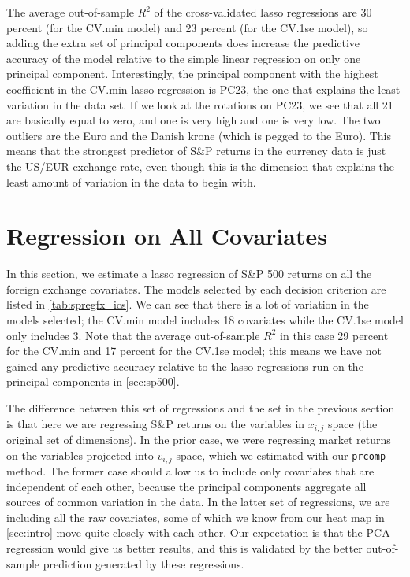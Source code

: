 \documentclass[11pt, fleqn]{article}
\begin{document}


The average out-of-sample $R^2$ of the cross-validated lasso regressions are 30 percent (for the CV.min model) and 23 percent (for the CV.1se model), so adding the extra set of principal components does increase the predictive accuracy of the model relative to the simple linear regression on only one principal component. Interestingly, the principal component with the highest coefficient in the CV.min lasso regression is PC23, the one that explains the least variation in the data set. If we look at the rotations on PC23, we see that all 21 are basically equal to zero, and one is very high and one is very low. The two outliers are the Euro and the Danish krone (which is pegged to the Euro). This means that the strongest predictor of S\&P returns in the currency data is just the US/EUR exchange rate, even though this is the dimension that explains the least amount of variation in the data to begin with.

\section{Regression on All Covariates} \label{sec:regall}

In this section, we estimate a lasso regression of S\&P 500 returns on all the foreign exchange covariates. The models selected by each decision criterion are listed in \cref{tab:spregfx_ics}. We can see that there is a lot of variation in the models selected; the CV.min model includes 18 covariates while the CV.1se model only includes 3. Note that the average out-of-sample $R^2$ in this case 29 percent for the CV.min and 17 percent for the CV.1se model; this means we have not gained any predictive accuracy relative to the lasso regressions run on the principal components in \cref{sec:sp500}. 

The difference between this set of regressions and the set in the previous section is that here we are regressing S\&P returns on the variables in $x_{i,j}$ space (the original set of dimensions). In the prior case, we were regressing market returns on the variables projected into $v_{i,j}$ space, which we estimated with our \texttt{prcomp} method. The former case should allow us to include only covariates that are independent of each other, because the principal components aggregate all sources of common variation in the data. In the latter set of regressions, we are including all the raw covariates, some of which we know from our heat map in \cref{sec:intro} move quite closely with each other. Our expectation is that the PCA regression would give us better results, and this is validated by the better out-of-sample prediction generated by these regressions.
\end{document}
